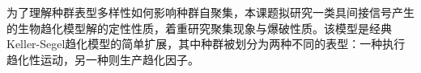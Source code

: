 \documentclass[12pt]{article}
\begin{document}
为了理解种群表型多样性如何影响种群自聚集，本课题拟研究一类具间接信号产生的生物趋化模型解的定性性质，着重研究聚集现象与爆破性质。该模型是经典Keller-Segel趋化模型的简单扩展，其中种群被划分为两种不同的表型：一种执行趋化性运动，另一种则生产趋化因子。






\end{document}
